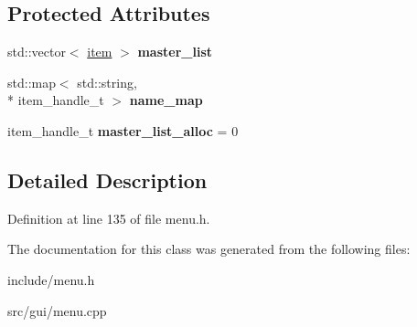 \subsection*{Protected Attributes}
\begin{DoxyCompactItemize}
\item 
\hypertarget{classDOSBoxMenu_ad2a347d84ac94b3c021838429bf2e128}{std\-::vector$<$ \hyperlink{classDOSBoxMenu_1_1item}{item} $>$ {\bfseries master\-\_\-list}}\label{classDOSBoxMenu_ad2a347d84ac94b3c021838429bf2e128}

\item 
\hypertarget{classDOSBoxMenu_af85ccb33204bfee0d93cbd73b334443f}{std\-::map$<$ std\-::string, \\*
item\-\_\-handle\-\_\-t $>$ {\bfseries name\-\_\-map}}\label{classDOSBoxMenu_af85ccb33204bfee0d93cbd73b334443f}

\item 
\hypertarget{classDOSBoxMenu_a8dd5513e70a30740a14ca14dd93c384a}{item\-\_\-handle\-\_\-t {\bfseries master\-\_\-list\-\_\-alloc} = 0}\label{classDOSBoxMenu_a8dd5513e70a30740a14ca14dd93c384a}

\end{DoxyCompactItemize}


\subsection{Detailed Description}


Definition at line 135 of file menu.\-h.



The documentation for this class was generated from the following files\-:\begin{DoxyCompactItemize}
\item 
include/menu.\-h\item 
src/gui/menu.\-cpp\end{DoxyCompactItemize}
